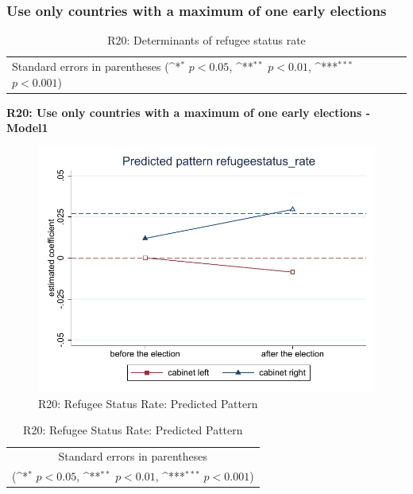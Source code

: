 \documentclass[10pt,a4paper]{scrartcl}
\begin{document}


\clearpage
\FloatBarrier
\subsubsection{Use only countries with a maximum of one early elections}
\begin{table}[!ht]\centering
	\renewcommand{\arraystretch}{1.25}
	\small
	\def\sym#1{\ifmmode^{#1}\else\(^{#1}\)\fi}
	\caption{R20: Determinants of refugee status rate}
	\begin{tabular}{l*{3}{c}}
		\hline\hline
		
		\hline\hline
		\multicolumn{4}{l}{\footnotesize Standard errors in parentheses (\sym{*} \(p<0.05\), \sym{**} \(p<0.01\), \sym{***} \(p<0.001\))}\\
	\end{tabular}
\end{table}

\clearpage
\textbf{R20: Use only countries with a maximum of one early elections - Model1}
\begin{figure}[!ht]
	\centering
	\includegraphics[width=1\textwidth]{figures_edited/refugeestatus_rate_graph1_R20.pdf}
	\caption{R20: Refugee Status Rate: Predicted Pattern}
\end{figure}

\begin{table}[!ht]\centering
	\renewcommand{\arraystretch}{1.25}
	\def\sym#1{\ifmmode^{#1}\else\(^{#1}\)\fi}
	\caption{R20: Refugee Status Rate: Predicted Pattern}
	\begin{tabular}{l*{2}{c}}
		\hline\hline
		
		\hline\hline
		\multicolumn{3}{c}{\footnotesize Standard errors in parentheses} \\
		\multicolumn{3}{c}{\footnotesize (\sym{*} \(p<0.05\), \sym{**} \(p<0.01\), \sym{***} \(p<0.001\))}\\
	\end{tabular}
\end{table}
\end{document}
